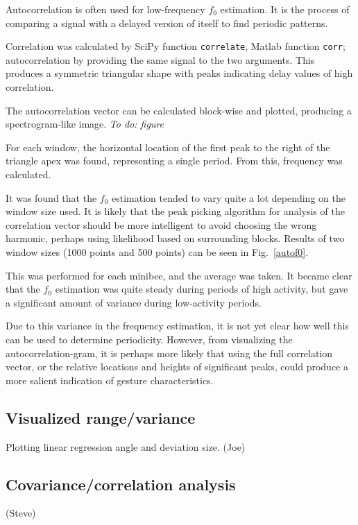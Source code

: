 \documentclass{article}
\newcommand{\todo}[1]{\emph{To do: #1}}
\newcommand{\func}[1]{\texttt{#1}}
\begin{document}
Autocorrelation is often used for low-frequency $f_0$ estimation.
It is the process of comparing a signal with a delayed version of
itself to find periodic patterns.

Correlation was calculated by SciPy function \func{correlate}, Matlab
function \func{corr}; autocorrelation by providing the same signal to
the two arguments.
This produces a symmetric triangular shape with peaks indicating delay
values of high correlation.

The autocorrelation vector can be calculated block-wise and plotted,
producing a spectrogram-like image. \todo{figure}

For each window, the horizontal location of the first peak to the
right of the triangle apex was found, representing a single period.
From this, frequency was calculated.

It was found that the $f_0$ estimation tended to vary quite a lot
depending on the window size used.
It is likely that the peak picking algorithm for analysis of the
correlation vector should be more intelligent to avoid choosing the
wrong harmonic, perhaps using likelihood based on surrounding blocks.
Results of two window sizes (1000 points and 500 points) can be seen
in Fig.~\ref{autof0}.

This was performed for each minibee, and the average was taken.  It
became clear that the $f_0$ estimation was quite steady during periods
of high activity, but gave a significant amount of variance during
low-activity periods.

Due to this variance in the frequency estimation, it is not yet clear
how well this can be used to determine periodicity.  However, from
visualizing the autocorrelation-gram, it is perhaps more likely that
using the full correlation vector, or the relative locations and
heights of significant peaks, could produce a more salient indication
of gesture characteristics.

\subsection{Visualized range/variance}

Plotting linear regression angle and deviation size. (Joe)

\subsection{Covariance/correlation analysis}

(Steve)
\end{document}
